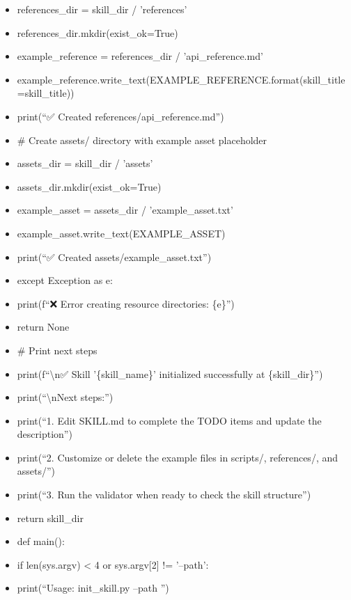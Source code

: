 \documentclass[11pt]{article}
\begin{document}
\begin{itemize}[leftmargin=*,itemsep=2pt,topsep=2pt]
\item {} references\_\allowbreak{}dir = skill\_\allowbreak{}dir / 'references'
\item {} references\_\allowbreak{}dir.mkdir(exist\_\allowbreak{}ok=True)
\item {} example\_\allowbreak{}reference = references\_\allowbreak{}dir / 'api\_\allowbreak{}reference.md'
\item {} example\_\allowbreak{}reference.write\_\allowbreak{}text(EXAMPLE\_\allowbreak{}REFERENCE.format(skill\_\allowbreak{}title=skill\_\allowbreak{}title))
\item {} print(``✅ Created references/api\_\allowbreak{}reference.md'')
\item {} \# Create assets/ directory with example asset placeholder
\item {} assets\_\allowbreak{}dir = skill\_\allowbreak{}dir / 'assets'
\item {} assets\_\allowbreak{}dir.mkdir(exist\_\allowbreak{}ok=True)
\item {} example\_\allowbreak{}asset = assets\_\allowbreak{}dir / 'example\_\allowbreak{}asset.txt'
\item {} example\_\allowbreak{}asset.write\_\allowbreak{}text(EXAMPLE\_\allowbreak{}ASSET)
\item {} print(``✅ Created assets/example\_\allowbreak{}asset.txt'')
\item {} except Exception as e:
\item {} print(f``❌ Error creating resource directories: \{e\}'')
\item {} return None
\item {} \# Print next steps
\item {} print(f``\textbackslash{}n✅ Skill '\{skill\_\allowbreak{}name\}' initialized successfully at \{skill\_\allowbreak{}dir\}'')
\item {} print(``\textbackslash{}nNext steps:'')
\item {} print(``1. Edit SKILL.md to complete the TODO items and update the description'')
\item {} print(``2. Customize or delete the example files in scripts/, references/, and assets/'')
\item {} print(``3. Run the validator when ready to check the skill structure'')
\item {} return skill\_\allowbreak{}dir
\item {} def main():
\item {} if len(sys.argv) < 4 or sys.argv[2] != '--path':
\item {} print(``Usage: init\_\allowbreak{}skill.py --path '')

\end{itemize}
\end{document}
